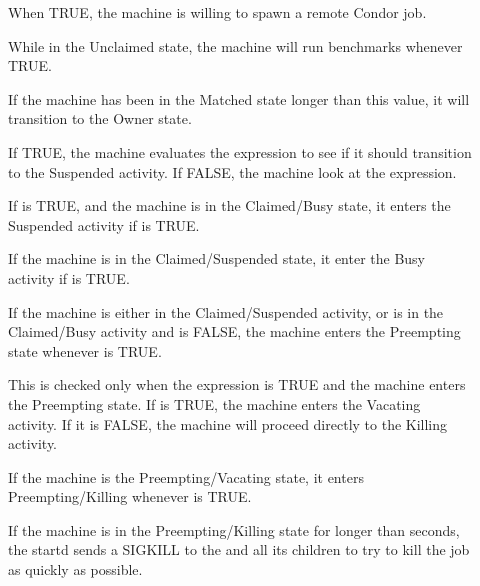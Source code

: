 \begin{description}
  
\item[] When TRUE, the machine is willing to spawn
  a remote Condor job.
  
\item[] While in the Unclaimed state, the machine
  will run benchmarks whenever TRUE.
  
\item[] If the machine has been in the Matched
  state longer than this value, it will transition to the Owner state.
  
\item[] If TRUE, the machine evaluates
  the  expression to see if it should transition to the
  Suspended activity.  If FALSE, the machine look at
  the  expression.
  
\item[] If  is TRUE, and the machine
  is in the Claimed/Busy state, it enters the Suspended activity
  if  is TRUE.
  
\item[] If the machine is in the Claimed/Suspended
  state, it enter the Busy activity if  is TRUE.
  
\item[] If the machine is either in the Claimed/Suspended
  activity, or is in the Claimed/Busy activity and
   is FALSE, the machine enters the Preempting
  state whenever  is TRUE. 
  
\item[] This is checked only when the
   expression is TRUE and the machine enters the
  Preempting state.
  If  is TRUE, the machine enters the Vacating
  activity.  
  If it is FALSE, the machine will proceed directly to the Killing
  activity.  
  
\item[] If the machine is the Preempting/Vacating state, it
  enters Preempting/Killing whenever  is TRUE. 
  
\item[] If the machine is in the
  Preempting/Killing state for longer than 
  seconds, the startd sends a SIGKILL to the 
  and all its children to try to kill the job as quickly as possible.
  

\end{description}
